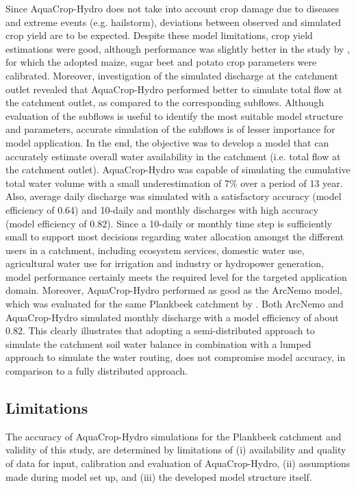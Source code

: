Since AquaCrop-Hydro does not take into account crop damage due to diseases and extreme events (e.g. hailstorm), deviations between observed and simulated crop yield are to be expected. Despite these model limitations, crop yield estimations were good, although performance was slightly better in the study by \textcite{vanuytrecht2015}, for which the adopted maize, sugar beet and potato crop parameters were calibrated. Moreover, investigation of the simulated discharge at the catchment outlet revealed that AquaCrop-Hydro performed better to simulate total flow at the catchment outlet, as compared to the corresponding subflows. Although evaluation of the subflows is useful to identify the most suitable model structure and parameters, accurate simulation of the subflows is of lesser importance for model application. In the end, the objective was to develop a model that can accurately estimate overall water availability in the catchment (i.e. total flow at the catchment outlet). AquaCrop-Hydro was capable of simulating the cumulative total water volume with a small underestimation of 7\% over a period of 13 year. Also, average daily discharge was simulated with a satisfactory accuracy (model efficiency of 0.64) and 10-daily and monthly discharges with high accuracy (model efficiency of 0.82). Since a 10-daily or monthly time step is sufficiently small to support most decisions regarding water allocation amongst the different users in a catchment, including ecosystem services, domestic water use, agricultural water use for irrigation and industry or hydropower generation, model performance certainly meets the required level for the targeted application domain. Moreover, AquaCrop-Hydro performed as good as the ArcNemo model,  which was evaluated for the same Plankbeek catchment by \textcite{vanopstal2014}. Both ArcNemo and AquaCrop-Hydro simulated monthly discharge with a model efficiency of  about 0.82. This clearly illustrates that adopting a semi-distributed approach to simulate the catchment soil water balance in combination with a lumped approach to simulate the water routing, does not compromise model accuracy, in comparison to a fully distributed approach. 

\subsection{Limitations}
The accuracy of AquaCrop-Hydro simulations for the Plankbeek catchment and validity of this study, are determined by limitations of (i) availability and quality of data for input, calibration and evaluation of AquaCrop-Hydro, (ii) assumptions made during model set up, and (iii) the developed model structure itself. 

